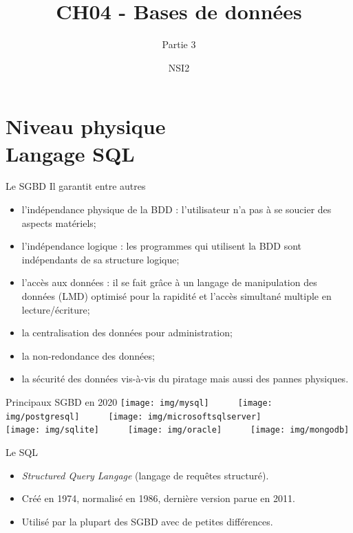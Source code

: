 \documentclass[10pt]{nsibeamer}
\title{CH04 - Bases de données}
\subtitle{Partie 3}
\author{NSI2}
\begin{document}
\maketitle
\section{Niveau physique\\ Langage SQL}
\begin{frame}{Le SGBD}
    Il garantit entre autres\pause
    \begin{itemize}
        \item	\alert{l'indépendance physique} de la BDD : l'utilisateur n'a pas à se soucier des aspects matériels;\pause
        \item	\alert{l'indépendance logique} : les programmes qui utilisent la BDD sont indépendants de sa structure logique;\pause
        \item 	\alert{l'accès aux données} : il se fait grâce à un \alert{langage de manipulation des données} (LMD) optimisé pour la rapidité et l'accès simultané multiple en lecture/écriture;\pause
        \item 	\alert{la centralisation des données pour administration};\pause
        \item 	\alert{la non-redondance des données};\pause
        \item 	\alert{la sécurité des données} vis-à-vis du piratage mais aussi des pannes physiques.
    \end{itemize}
\end{frame}

\begin{frame}{Principaux SGBD en 2020}
    \texttt{[image: img/mysql]}\ \ \ \ \ \ \texttt{[image: img/postgresql]}\ \ \ \ \ \ \texttt{[image: img/microsoftsqlserver]}\\
    
    \texttt{[image: img/sqlite]}\ \ \ \ \ \ \texttt{[image: img/oracle]}\ \ \ \ \ \ \texttt{[image: img/mongodb]}
    
\end{frame}
\begin{frame}{Le SQL}
    \begin{itemize}
        \item	\textit{Structured Query Langage} (langage de requêtes structuré).\pause
        \item	Créé en 1974, normalisé en 1986, dernière version parue en 2011.\pause
        \item 	Utilisé par la plupart des SGBD avec de petites différences.
    \end{itemize}
    
\end{frame}
\end{document}
